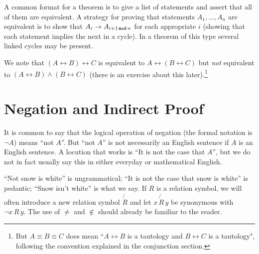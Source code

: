 \documentclass[12pt]{book}
\begin{document}
A common format for a theorem is to give a list of statements and
assert that all of them are equivalent.  A strategy for proving that
statements $A_1,\ldots,A_n$ are equivalent is to show that $A_i \rightarrow
A_{i+1\,{\tt mod}\, n}$ for each appropriate $i$ (showing that each
statement implies the next in a cycle).  In a theorem of this type
several linked cycles may be present.

We note that $(A \leftrightarrow B) \leftrightarrow C$ is equivalent to $A \leftrightarrow (B
\leftrightarrow C)$ but {\em not\/} equivalent to $(A \leftrightarrow B) \wedge (B
\leftrightarrow C)$ (there is an exercise about this later).\footnote{But $A \equiv B \equiv C$ does mean ``$A \leftrightarrow B$ is a tautology and $B \leftrightarrow C$ is a tautology", following the convention explained in  the conjunction section.}

\section{Negation and Indirect Proof}

It is common to say that the logical operation of negation (the formal
notation is $\neg A$) means ``not $A$''.  But ``not $A$'' is not
necessarily an English sentence if $A$ is an English sentence.  A
locution that works is ``It is not the case that $A$'', but we do not
in fact usually say this in either everyday or mathematical English.

``Not snow is white'' is ungrammatical; ``It is not the case that snow
is white'' is pedantic; ``Snow isn't white'' is what we say.  If $R$
is a relation symbol, we will often introduce a new relation symbol
$\not{R}$ and let $x\, \not{R}\, y$ be synonymous with $\neg x \,R\,y$.
The use of $\neq$ and $\not\in$ should already be familiar to the
reader.
\end{document}
